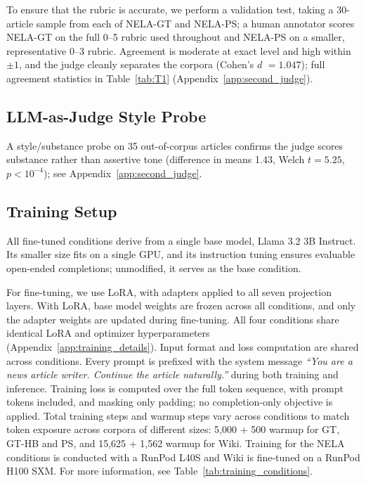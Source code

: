 \documentclass[11pt]{article}
\begin{document}
To ensure that the rubric is accurate, we perform a validation test, taking a 30-article sample from each of NELA-GT and NELA-PS; a human annotator scores NELA-GT on the full 0--5 rubric used throughout and NELA-PS on a smaller, representative 0--3 rubric.
Agreement is moderate at exact level and high within $\pm1$, and the judge cleanly separates the corpora (Cohen's $d$ \cite{cohen1988} $= 1.047$); full agreement statistics in Table~\ref{tab:T1} (Appendix~\ref{app:second_judge}).




\subsection{LLM-as-Judge Style Probe}
A style/substance probe on 35 out-of-corpus articles confirms the judge scores substance rather than assertive tone (difference in means 1.43, Welch $t=5.25$, $p<10^{-4}$); see Appendix~\ref{app:second_judge}.


\subsection{Training Setup}

All fine-tuned conditions derive from a single base model, Llama 3.2 3B Instruct. 
Its smaller size fits on a single GPU, and its instruction tuning ensures evaluable open-ended completions; unmodified, it serves as the base condition.

For fine-tuning, we use LoRA, with adapters applied to all seven projection layers. 
With LoRA, base model weights are frozen across all conditions, and only the adapter weights are updated during fine-tuning. 
All four conditions share identical LoRA and optimizer hyperparameters (Appendix~\ref{app:training_details}).
Input format and loss computation are shared across conditions.
Every prompt is prefixed with the system message \textit{``You are a news article writer. Continue the article naturally.''} during both training and inference.
Training loss is computed over the full token sequence, with prompt tokens included, and masking only padding; no completion-only objective is applied.
Total training steps and warmup steps vary across conditions to match token exposure across corpora of different sizes: 5{,}000 + 500 warmup for GT, GT-HB and PS, and 15{,}625 + 1{,}562 warmup for Wiki.
Training for the NELA conditions is conducted with a RunPod L40S and Wiki is fine-tuned on a RunPod H100 SXM.
For more information, see Table~\ref{tab:training_conditions}.
\end{document}
